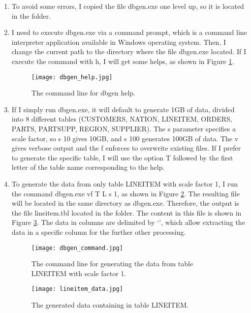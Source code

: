 \documentclass[../main/thesis.tex]{subfiles}
\begin{document}
\begin{enumerate}[label=\thesection.\arabic*, leftmargin=1.7cm]
	\item To avoid some errors, I copied the file dbgen.exe one level up, so it is located in the  folder.
	
	\item I need to execute dbgen.exe via a command prompt, which is a command line interpreter application available in Windows operating system. Then, I change the current path to the directory where the file dbgen.exe located. If I execute the command with \textendash h, I will get some helps, as shown in Figure \ref{fig:dbgen_help}.
	
	\begin{figure}[h]
		\centering
		\texttt{[image: dbgen\_help.jpg]}
		\caption{The command line for dbgen help.}
		\label{fig:dbgen_help}
	\end{figure}
	
	\item If I simply run dbgen.exe, it will default to generate 1GB of data, divided into 8 different tables (CUSTOMERS, NATION, LINEITEM, ORDERS, PARTS, PARTSUPP, REGION, SUPPLIER). The \textendash s parameter specifies a scale factor, so \textendash s 10 gives 10GB, and \textendash s 100 generates 100GB of data. The \textendash v gives verbose output and the \textendash f enforces to overwrite existing files. If I prefer to generate the specific table, I will use the option \textendash T followed by the first letter of the table name corresponding to the help.
	
	\item To generate the data from only table LINEITEM with scale factor 1, I run the command dbgen.exe \textendash vf \textendash T L \textendash s 1, as shown in Figure \ref{fig:dbgen_command}. The resulting file will be located in the same directory as dbgen.exe. Therefore, the output is the file lineitem.tbl located in the  folder. The content in this file is shown in Figure \ref{fig:lineitem_data}. The data in columns are delimited by `\textbar', which allow extracting the data in a specific column for the further other processing.
	
	\begin{figure}[h]
		\centering
		\texttt{[image: dbgen\_command.jpg]}
		\caption{The command line for generating the data from table LINEITEM with scale factor 1.}
		\label{fig:dbgen_command}
	\end{figure}
	
	\begin{figure}[h]
		\centering
		\texttt{[image: lineitem\_data.jpg]}
		\caption{The generated data containing in table LINEITEM.}
		\label{fig:lineitem_data}
	\end{figure}
\end{enumerate}

\bib
\end{document}
